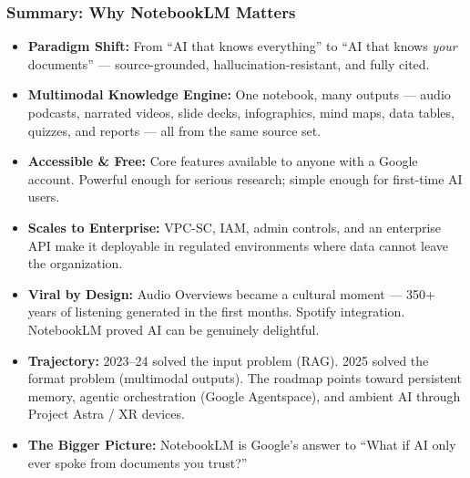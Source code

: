 \begin{frame}[fragile]\frametitle{Summary: Why NotebookLM Matters}
  \begin{itemize}
    \item \textbf{Paradigm Shift:} From ``AI that knows everything'' to ``AI that knows \textit{your} documents'' — source-grounded, hallucination-resistant, and fully cited.
    \item \textbf{Multimodal Knowledge Engine:} One notebook, many outputs — audio podcasts, narrated videos, slide decks, infographics, mind maps, data tables, quizzes, and reports — all from the same source set.
    \item \textbf{Accessible \& Free:} Core features available to anyone with a Google account. Powerful enough for serious research; simple enough for first-time AI users.
    \item \textbf{Scales to Enterprise:} VPC-SC, IAM, admin controls, and an enterprise API make it deployable in regulated environments where data cannot leave the organization.
    \item \textbf{Viral by Design:} Audio Overviews became a cultural moment — 350+ years of listening generated in the first months. Spotify integration. NotebookLM proved AI can be genuinely delightful.
    \item \textbf{Trajectory:} 2023--24 solved the input problem (RAG). 2025 solved the format problem (multimodal outputs). The roadmap points toward persistent memory, agentic orchestration (Google Agentspace), and ambient AI through Project Astra / XR devices.
    \item \textbf{The Bigger Picture:} NotebookLM is Google's answer to ``What if AI only ever spoke from documents you trust?''
  \end{itemize}
\end{frame}

